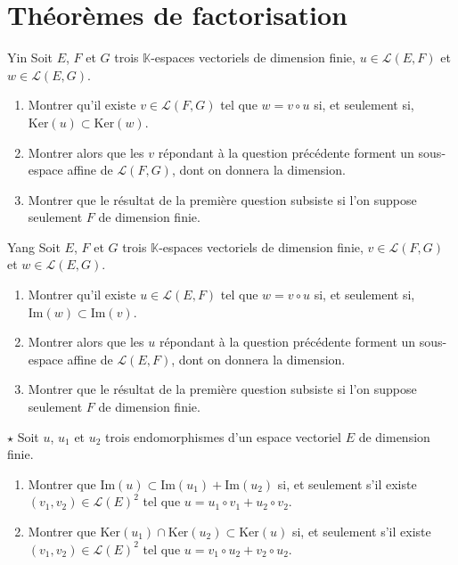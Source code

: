 \documentclass[french,a4paper]{article}
\newcommand{\K}{\mathbb{K}}
\renewcommand{\ker}{\text{Ker}}
\theoremstyle{plain}
\theoremstyle{definition}
\theoremstyle{remark}
\begin{document}
\section{Théorèmes de factorisation}

\begin{ex}[Moulin.48]{Yin}
	Soit $E$, $F$ et $G$ trois $\K$-espaces vectoriels de dimension finie, $u\in\mathcal{L}(E,F)$ et $w\in\mathcal{L}(E,G)$.
	\begin{enumerate}
		\item Montrer qu'il existe $v\in\mathcal{L}(F,G)$ tel que $w=v\circ u$ si, et seulement si, $\ker(u)\subset\ker(w)$.
		\item Montrer alors que les $v$ répondant à la question précédente forment un sous-espace affine de $\mathcal{L}(F,G)$, dont on donnera la dimension.
		\item Montrer que le résultat de la première question subsiste si l'on suppose seulement $F$ de dimension finie.
	\end{enumerate}
\end{ex}

\begin{ex}[Moulin.49]{Yang}
	Soit $E$, $F$ et $G$ trois $\K$-espaces vectoriels de dimension finie, $v\in\mathcal{L}(F,G)$ et $w\in\mathcal{L}(E,G)$.
	\begin{enumerate}
		\item Montrer qu'il existe $u\in\mathcal{L}(E,F)$ tel que $w=v\circ u$ si, et seulement si, $\text{Im}(w)\subset\text{Im}(v)$.
		\item Montrer alors que les $u$ répondant à la question précédente forment un sous-espace affine de $\mathcal{L}(E,F)$, dont on donnera la dimension.
		\item Montrer que le résultat de la première question subsiste si l'on suppose seulement $F$ de dimension finie.
	\end{enumerate}
\end{ex}

\begin{ex}[Moulin.50]{$\star$}
	Soit $u$, $u_1$ et $u_2$ trois endomorphismes d'un espace vectoriel $E$ de dimension finie.
	\begin{enumerate}
		\item Montrer que $\text{Im}(u)\subset\text{Im}(u_1)+\text{Im}(u_2)$ si, et seulement s'il existe $(v_1,v_2)\in\mathcal{L}(E)^2$ tel que $u=u_1\circ v_1+u_2\circ v_2$.
		\item Montrer que $\ker(u_1)\cap\ker(u_2)\subset\ker(u)$ si, et seulement s'il existe $(v_1,v_2)\in\mathcal{L}(E)^2$ tel que $u=v_1\circ u_2+v_2\circ u_2$.
	\end{enumerate}
\end{ex}
\end{document}
